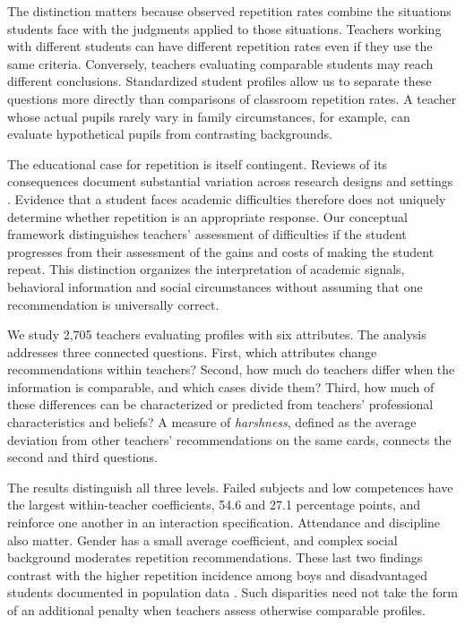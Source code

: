 The distinction matters because observed repetition rates combine the situations students face with the judgments applied to those situations. Teachers working with different students can have different repetition rates even if they use the same criteria. Conversely, teachers evaluating comparable students may reach different conclusions. Standardized student profiles allow us to separate these questions more directly than comparisons of classroom repetition rates. A teacher whose actual pupils rarely vary in family circumstances, for example, can evaluate hypothetical pupils from contrasting backgrounds.

The educational case for repetition is itself contingent. Reviews of its consequences document substantial variation across research designs and settings \cite{allen,goos}. Evidence that a student faces academic difficulties therefore does not uniquely determine whether repetition is an appropriate response. Our conceptual framework distinguishes teachers' assessment of difficulties if the student progresses from their assessment of the gains and costs of making the student repeat. This distinction organizes the interpretation of academic signals, behavioral information and social circumstances without assuming that one recommendation is universally correct.

We study 2,705 teachers evaluating profiles with six attributes. The analysis addresses three connected questions. First, which attributes change recommendations within teachers? Second, how much do teachers differ when the information is comparable, and which cases divide them? Third, how much of these differences can be characterized or predicted from teachers' professional characteristics and beliefs? A measure of \textit{harshness}, defined as the average deviation from other teachers' recommendations on the same cards, connects the second and third questions.


The results distinguish all three levels. Failed subjects and low competences have the largest within-teacher coefficients, 54.6 and 27.1 percentage points, and reinforce one another in an interaction specification. Attendance and discipline also matter. Gender has a small average coefficient, and complex social background moderates repetition recommendations. These last two findings contrast with the higher repetition incidence among boys and disadvantaged students documented in population data \cite{oecd}. Such disparities need not take the form of an additional penalty when teachers assess otherwise comparable profiles.

